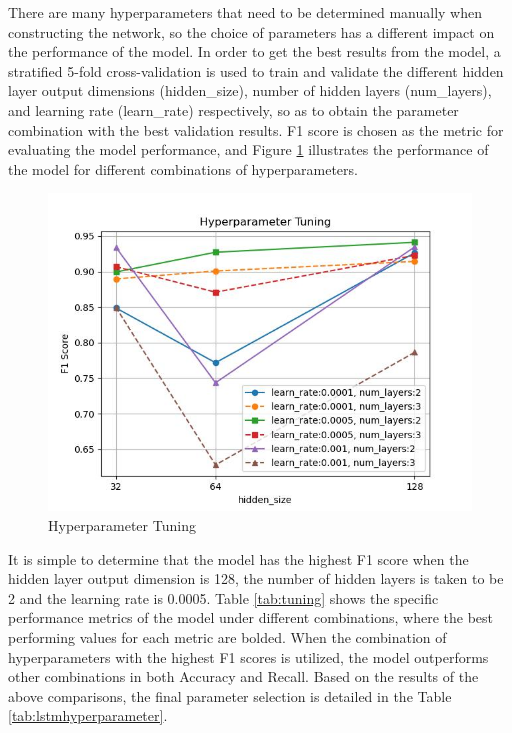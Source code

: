 \documentclass[ %
                    author={Bocheng Wang},
                supervisor={Dr. Qiang Liu},
                    degree={MSc},
                     title={A Research on Identification of Suicide Ideation in Texts with Multiple Models},
                      type={},
                      year={2024}]{dissertation}
\begin{document}
There are many hyperparameters that need to be determined manually when constructing the network, so the choice of parameters has a different impact on the performance of the model. In order to get the best results from the model, a stratified 5-fold cross-validation is used to train and validate the different hidden layer output dimensions (hidden\_size), number of hidden layers (num\_layers), and learning rate (learn\_rate) respectively, so as to obtain the parameter combination with the best validation results. F1 score is chosen as the metric for evaluating the model performance, and Figure \ref{fig:tune} illustrates the performance of the model for different combinations of hyperparameters.

\begin{figure}[h]
      \centering
      \includegraphics[width=0.8\linewidth]{../img/lstm_tuning.jpg}
      \caption{Hyperparameter Tuning}
      \label{fig:tune}
\end{figure}

It is simple to determine that the model has the highest F1 score when the hidden layer output dimension is 128, the number of hidden layers is taken to be 2 and the learning rate is 0.0005. Table \ref{tab:tuning} shows the specific performance metrics of the model under different combinations, where the best performing values for each metric are bolded. When the combination of hyperparameters with the highest F1 scores is utilized, the model outperforms other combinations in both Accuracy and Recall. Based on the results of the above comparisons, the final parameter selection is detailed in the Table \ref{tab:lstmhyperparameter}. 
\end{document}
